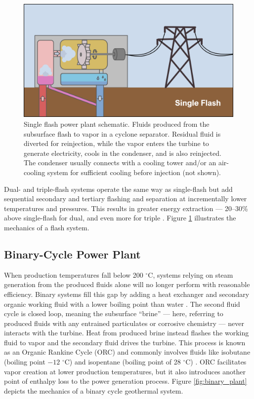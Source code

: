 \begin{figure}
\centering
\includegraphics[width=.9\textwidth]{templates/images/Figure-FlashPlant_Schematic.png}
\caption[Single flash power plant schematic]{Single flash power plant schematic. Fluids produced from the subsurface flash to vapor in a cyclone separator. Residual fluid is diverted for reinjection, while the vapor enters the turbine to generate electricity, cools in the condenser, and is also reinjected. The condenser usually connects with a cooling tower and/or an air-cooling system for sufficient cooling before injection (not shown).}
\label{fig:flash_plant}
\end{figure}

Dual- and triple-flash systems operate the same way as single-flash but add sequential secondary and tertiary flashing and separation at incrementally lower temperatures and pressures. This results in greater energy extraction --- 20--30\% above single-flash for dual, and even more for triple \citep[p.\ 216]{glassley_geothermal_2015}. Figure \ref{fig:flash_plant} illustrates the mechanics of a flash system.

\subsection{Binary-Cycle Power Plant}\label{ch2:binary_plant}

When production temperatures fall below 200 $^\circ$C, systems relying on steam generation from the produced fluids alone will no longer perform with reasonable efficiency. Binary systems fill this gap by adding a heat exchanger and secondary organic working fluid with a lower boiling point than water \citep{moore_more_2013}. The second fluid cycle is closed loop, meaning the subsurface ``brine'' --- here, referring to produced fluids with any entrained particulates or corrosive chemistry --- never interacts with the turbine. Heat from produced brine instead flashes the working fluid to vapor and the secondary fluid drives the turbine. This process is known as an Organic Rankine Cycle (ORC) and commonly involves fluids like isobutane (boiling point $-12$ $^\circ$C) and isopentane (boiling point of 28 $^\circ$C) \citep[p.\ 219]{glassley_geothermal_2015}. ORC facilitates vapor creation at lower production temperatures, but it also introduces another point of enthalpy loss to the power generation process. Figure \ref{fig:binary_plant} depicts the mechanics of a binary cycle geothermal system.

